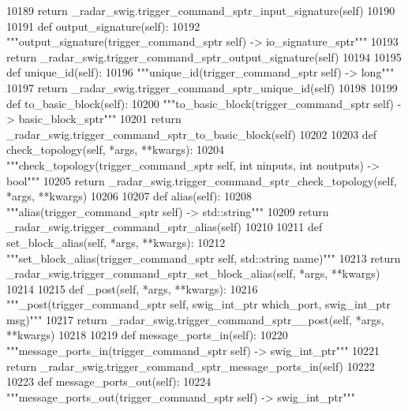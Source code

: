 \begin{DoxyCode}
{{{{{{{{{{{{{{{{{{{{{{{{{{{{{{{{10189         \textcolor{keywordflow}{return} \_radar\_swig.trigger\_command\_sptr\_input\_signature(self)
10190 
10191     \textcolor{keyword}{def }output_signature(self):
10192         \textcolor{stringliteral}{"""output\_signature(trigger\_command\_sptr self) -> io\_signature\_sptr"""}
10193         \textcolor{keywordflow}{return} \_radar\_swig.trigger\_command\_sptr\_output\_signature(self)
10194 
10195     \textcolor{keyword}{def }unique_id(self):
10196         \textcolor{stringliteral}{"""unique\_id(trigger\_command\_sptr self) -> long"""}
10197         \textcolor{keywordflow}{return} \_radar\_swig.trigger\_command\_sptr\_unique\_id(self)
10198 
10199     \textcolor{keyword}{def }to_basic_block(self):
10200         \textcolor{stringliteral}{"""to\_basic\_block(trigger\_command\_sptr self) -> basic\_block\_sptr"""}
10201         \textcolor{keywordflow}{return} \_radar\_swig.trigger\_command\_sptr\_to\_basic\_block(self)
10202 
10203     \textcolor{keyword}{def }check_topology(self, *args, **kwargs):
10204         \textcolor{stringliteral}{"""check\_topology(trigger\_command\_sptr self, int ninputs, int noutputs) -> bool"""}
10205         \textcolor{keywordflow}{return} \_radar\_swig.trigger\_command\_sptr\_check\_topology(self, *args, **kwargs)
10206 
10207     \textcolor{keyword}{def }alias(self):
10208         \textcolor{stringliteral}{"""alias(trigger\_command\_sptr self) -> std::string"""}
10209         \textcolor{keywordflow}{return} \_radar\_swig.trigger\_command\_sptr\_alias(self)
10210 
10211     \textcolor{keyword}{def }set_block_alias(self, *args, **kwargs):
10212         \textcolor{stringliteral}{"""set\_block\_alias(trigger\_command\_sptr self, std::string name)"""}
10213         \textcolor{keywordflow}{return} \_radar\_swig.trigger\_command\_sptr\_set\_block\_alias(self, *args, **kwargs)
10214 
10215     \textcolor{keyword}{def }_post(self, *args, **kwargs):
10216         \textcolor{stringliteral}{"""\_post(trigger\_command\_sptr self, swig\_int\_ptr which\_port, swig\_int\_ptr msg)"""}
10217         \textcolor{keywordflow}{return} \_radar\_swig.trigger\_command\_sptr\_\_post(self, *args, **kwargs)
10218 
10219     \textcolor{keyword}{def }message_ports_in(self):
10220         \textcolor{stringliteral}{"""message\_ports\_in(trigger\_command\_sptr self) -> swig\_int\_ptr"""}
10221         \textcolor{keywordflow}{return} \_radar\_swig.trigger\_command\_sptr\_message\_ports\_in(self)
10222 
10223     \textcolor{keyword}{def }message_ports_out(self):
10224         \textcolor{stringliteral}{"""message\_ports\_out(trigger\_command\_sptr self) -> swig\_int\_ptr"""}
}}}}}}}}}}}}}}}}}}}}}}}}}}}}}}}}
\end{DoxyCode}
